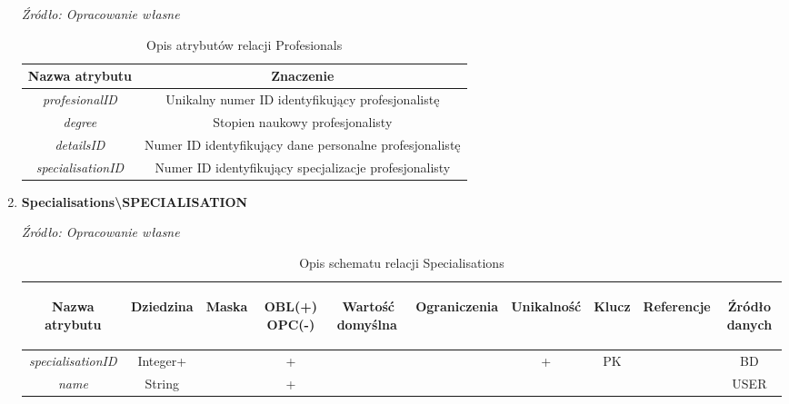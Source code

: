 \documentclass[12pt,twoside]{report}
\begin{document}
\begin{enumerate}[start=1,label={\bfseries REL\textbackslash0\arabic*}]
\begin{table}[H]
	\caption{Opis atrybutów relacji Profesionals}
	\textit{Źródło: Opracowanie własne}
	\label{ProfesionalsAttributeDescription}
	\centering
	\begin{tabular}{|c|c|}
		\hline
		Nazwa atrybutu & Znaczenie \\
			\hline
		\textit{profesionalID}& Unikalny numer ID identyfikujący profesjonalistę\\
		\hline
		\textit{degree}& Stopien naukowy profesjonalisty\\
		\hline
		\textit{detailsID}& Numer ID identyfikujący dane personalne profesjonalistę\\
		\hline
		\textit{specialisationID}&Numer ID identyfikujący specjalizacje profesjonalisty\\
		\hline
	\end{tabular}
\end{table}
\item \textbf{Specialisations\textbackslash SPECIALISATION}
\begin{table}[H]
	\caption{Opis schematu relacji Specialisations}
	\textit{Źródło: Opracowanie własne}
	\label{SpecialisationsRelationSchema}
	\centering
	\begin{tabular}{|c|c|c|c|c|c|c|c|c|c|}
		\hline
		\begin{sideways}Nazwa atrybutu\end{sideways}& 
		\begin{sideways}Dziedzina \end{sideways}& 
		\begin{sideways}Maska \end{sideways}& 
		\begin{sideways}OBL(+) OPC(-)\end{sideways} & 
		\begin{sideways}Wartość domyślna$\ $\end{sideways}& 
		\begin{sideways}Ograniczenia\end{sideways} &
		\begin{sideways}Unikalność \end{sideways}& 
		\begin{sideways}Klucz \end{sideways}& 
		\begin{sideways}Referencje \end{sideways}&
		\begin{sideways}Źródło danych\end{sideways}\\
		\hline
		\textit{specialisationID}&Integer+&&+&&&+&PK&&BD\\
		\hline
		\textit{name}&String&&+&&&&&&USER\\
		\hline
	\end{tabular}
\end{table}


\end{enumerate}
\end{document}
